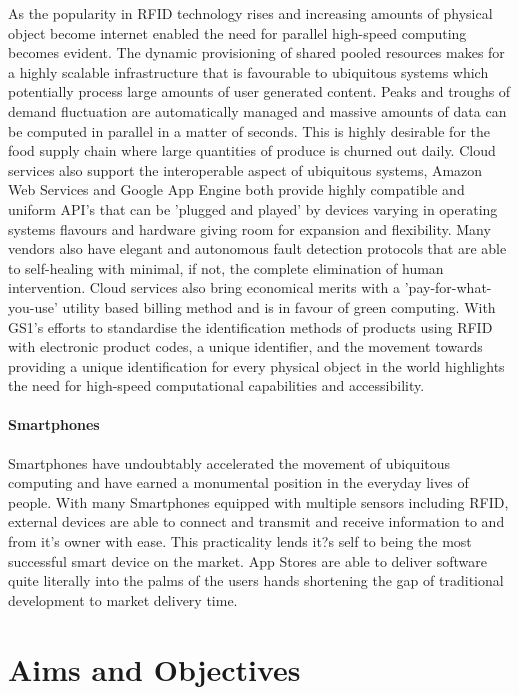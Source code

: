 \documentclass[a4paper, 11pt]{article}
\begin{document}
{As the popularity in RFID technology rises and increasing amounts of physical object become internet enabled the need for parallel high-speed computing becomes evident. The dynamic provisioning of shared pooled resources makes for a highly scalable infrastructure that is favourable to ubiquitous systems which potentially process large amounts of user generated content. Peaks and troughs of demand fluctuation are automatically managed and massive amounts of data can be computed in parallel in a matter of seconds. This is highly desirable for the food supply chain where large quantities of produce is churned out daily. Cloud services also support the interoperable aspect of ubiquitous systems, Amazon Web Services and Google App Engine both provide highly compatible and uniform API's that can be 'plugged and played' by devices varying in operating systems flavours and hardware giving room for expansion and flexibility. Many vendors also have elegant and autonomous fault detection protocols that are able to self-healing with minimal, if not, the complete elimination of human intervention. Cloud services also bring economical merits with a 'pay-for-what-you-use' utility based billing method and is in favour of green computing. With GS1's efforts to standardise the identification methods of products using RFID with electronic product codes, a unique identifier, and the movement towards providing a unique identification for every physical object in the world highlights the need for high-speed computational capabilities and accessibility. 

\paragraph{Smartphones}Smartphones have undoubtably accelerated the movement of ubiquitous computing and have earned a monumental position in the everyday lives of people. With many Smartphones equipped with multiple sensors including RFID, external devices are able to connect and transmit and receive information to and from it's owner with ease. This practicality lends it?s self to being the most successful smart device on the market. App Stores are able to deliver software quite literally into the palms of the users hands shortening the gap of traditional development to market delivery time. 

\clearpage

\section{Aims and Objectives}
}
\end{document}

